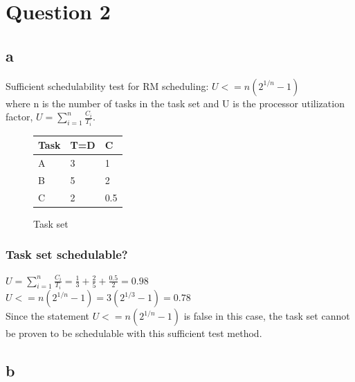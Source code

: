 \section{Question 2}
        \subsection{a}
            Sufficient schedulability test for RM scheduling: $U <= n(2^{1/n} - 1)$ \\ where n is the number of tasks in the task set and U is the processor utilization factor, $U = \sum_{i=1}^{n} \frac{C_i}{T_i}$. 

        \renewcommand{\arraystretch}{1.4}
        \begin{figure}[H]
        \centering
        \begin{minipage}{0.5\textwidth}
            \begin{table}[H]
            \centering
            \begin{tabular}{|l|l|l|}
                \hline
                \textbf{Task}   & \textbf{T=D}  & \textbf{C}  \\ \hline
                A               & 3             & 1           \\ \hline
                B               & 5             & 2           \\ \hline
                C               & 2             & 0.5         \\ \hline

            \end{tabular}
            \end{table}
        \end{minipage}%
        \caption{Task set}
        \label{fig:Taskset}
        \end{figure}
    \renewcommand{\arraystretch}{1.0}

        \subsubsection{Task set schedulable?}
        $U = \sum_{i=1}^{n} \frac{C_i}{T_i} = \frac{1}{3} + \frac{2}{5} + \frac{0.5}{2} = 0.98$ \\
        $U <= n(2^{1/n} - 1) = 3(2^{1/3} - 1) = 0.78$ \\
        Since the statement $U <= n(2^{1/n} - 1)$ is false in this case, the task set cannot be proven to be schedulable with this sufficient test method.

        \subsection{b}
